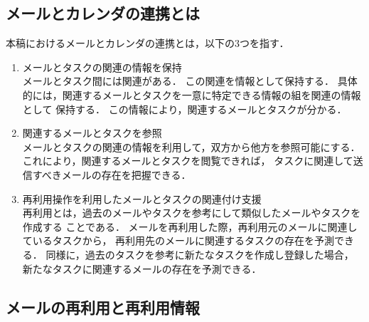 \documentclass[submit,techreq,noauthor,dvipdfmx]{ipsj}
\begin{document}
\subsection{メールとカレンダの連携とは}\label{sec:this_study_cooperation}

本稿におけるメールとカレンダの連携とは，以下の3つを指す．
\begin{enumerate}
\item メールとタスクの関連の情報を保持\\
メールとタスク間には関連がある．
この関連を情報として保持する．
具体的には，関連するメールとタスクを一意に特定できる情報の組を関連の情報として
保持する．
この情報により，関連するメールとタスクが分かる．

\item 関連するメールとタスクを参照\\
メールとタスクの関連の情報を利用して，双方から他方を参照可能にする．
これにより，関連するメールとタスクを閲覧できれば，
タスクに関連して送信すべきメールの存在を把握できる．

\item 再利用操作を利用したメールとタスクの関連付け支援\\
再利用とは，過去のメールやタスクを参考にして類似したメールやタスクを作成する
ことである．
メールを再利用した際，再利用元のメールに関連しているタスクから，
再利用先のメールに関連するタスクの存在を予測できる．
同様に，過去のタスクを参考に新たなタスクを作成し登録した場合，
新たなタスクに関連するメールの存在を予測できる．

\end{enumerate}


\subsection{メールの再利用と再利用情報}\label{sec:mail_reuse}
\end{document}
